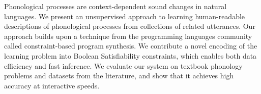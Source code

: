 Phonological processes are context-dependent sound changes in natural  languages. We present an unsupervised approach to learning human-readable descriptions of phonological processes from collections of related utterances. Our approach builds upon a technique from the programming languages community called constraint-based program synthesis. We contribute a novel encoding of the learning problem into Boolean Satisfiability constraints, which enables both data efficiency and fast inference. We evaluate our system on textbook phonology problems and datasets from the literature, and show that it achieves high accuracy at interactive speeds.

